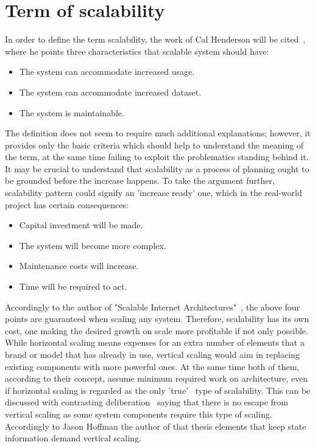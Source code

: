 \section{Term of scalability}\label{sec:scalability}
In order to define the term scalability, the work of Cal Henderson will be cited~\cite[pages 203--204]{build_scalable}, where he points three characteristics that scalable system should have:
\begin{itemize}
\item{The system can accommodate increased usage.}
\item{The system can accommodate increased dataset.}
\item{The system is maintainable.}
\end{itemize}
The definition does not seem to require much additional explanations; however, it provides only the basic criteria which should help to understand the meaning of the term, at the same time failing to exploit the problematics standing behind it. It may be crucial to understand that scalability as a process of planning ought to be grounded before the increase happens. To take the argument further, scalability pattern could signify an 'increase ready' one, which in the real-world project has certain consequences:
\begin{itemize}
\item{Capital investment will be made.}
\item{The system will become more complex.}
\item{Maintenance costs will increase.}
\item{Time will be required to act.}
\end{itemize}
Accordingly to the author of "Scalable Internet Architectures"~\cite[page 8]{scalable_arch}, the above four points are guaranteed when scaling any system. Therefore, scalability has its own cost, one making the desired growth on scale more profitable if not only possible. While horizontal scaling means expenses for an extra number of elements that a brand or model that has already in use, vertical scaling would aim in replacing existing components with more powerful ones. At the same time both of them, according to their concept, assume minimum required work on architecture, even if horizontal scaling is regarded as the only 'true'~\cite[page 5]{scalable_arch} type of scalability. This can be discussed with contrasting deliberation~\cite{ruby_scalable} saying that there is no escape from vertical scaling as some system components require this type of scaling. Accordingly to Jason Hoffman the author of that thesis elements that keep state information demand vertical scaling.  

